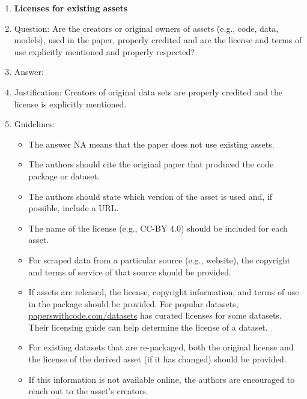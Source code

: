 \documentclass{article}
\begin{document}
\begin{enumerate}
\item {\bf Licenses for existing assets}
    \item[] Question: Are the creators or original owners of assets (e.g., code, data, models), used in the paper, properly credited and are the license and terms of use explicitly mentioned and properly respected?
    \item[] Answer: \answerYes{} %
    \item[] Justification: Creators of original data sets are properly credited and the license is explicitly mentioned. 
    \item[] Guidelines:
    \begin{itemize}
        \item The answer NA means that the paper does not use existing assets.
        \item The authors should cite the original paper that produced the code package or dataset.
        \item The authors should state which version of the asset is used and, if possible, include a URL.
        \item The name of the license (e.g., CC-BY 4.0) should be included for each asset.
        \item For scraped data from a particular source (e.g., website), the copyright and terms of service of that source should be provided.
        \item If assets are released, the license, copyright information, and terms of use in the package should be provided. For popular datasets, \url{paperswithcode.com/datasets} has curated licenses for some datasets. Their licensing guide can help determine the license of a dataset.
        \item For existing datasets that are re-packaged, both the original license and the license of the derived asset (if it has changed) should be provided.
        \item If this information is not available online, the authors are encouraged to reach out to the asset's creators.
    \end{itemize}


\end{enumerate}
\end{document}
